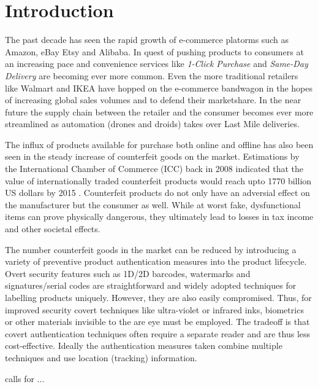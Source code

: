 \documentclass[thesis.tex]{subfiles}
\begin{document}
\chapter{Introduction}
\label{chapter:intro}

The past decade has seen the rapid growth of e-commerce platorms such as Amazon, eBay Etsy and Alibaba. In quest of pushing products to consumers at an increasing pace and convenience services like \emph{1-Click Purchase} and \emph{Same-Day Delivery} are becoming ever more common. Even the more traditional retailers like Walmart and IKEA have hopped on the e-commerce bandwagon in the hopes of increasing global sales volumes and to defend their marketshare. In the near future the supply chain between the retailer and the consumer becomes ever more streamlined as automation (drones and droids) takes over Last Mile deliveries.

The influx of products available for purchase both online and offline has also been seen in the steady increase of counterfeit goods on the market. Estimations by the International Chamber of Commerce (ICC) back in 2008 indicated that the value of internationally traded counterfeit products would reach upto 1770 billion US dollars by 2015 \cite{icc}. Counterfeit products do not only have an adversial effect on the manufacturer but the consumer as well. While at worst fake, dysfunctional items can prove physically dangerous, they ultimately lead to losses in tax income and other societal effects.

The number counterfeit goods in the market can be reduced by introducing a variety of preventive product authentication measures into the product lifecycle. Overt security features such as 1D/2D barcodes, watermarks and signatures/serial codes are straightforward and widely adopted techniques for labelling products uniquely. However, they are also easily compromised. Thus, for improved security covert techniques like ultra-violet or infrared inks, biometrics or other materials invisible to the are eye must be employed. The tradeoff is that covert authentication techniques often require a separate reader and are thus less cost-effective. Ideally the authentication measures taken combine multiple techniques and use location (tracking) information.

calls for ...

\end{document}
